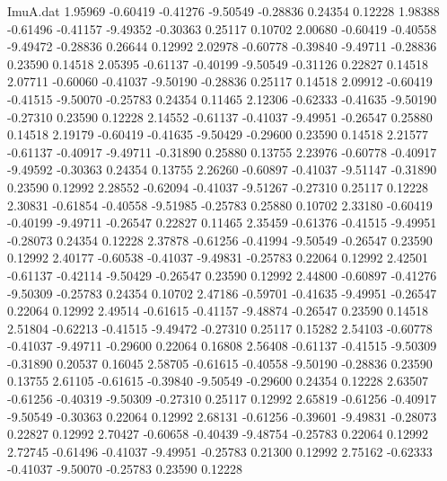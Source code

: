 \begin{filecontents}{ImuA.dat}
   1.95969   -0.60419   -0.41276   -9.50549   -0.28836    0.24354    0.12228
   1.98388   -0.61496   -0.41157   -9.49352   -0.30363    0.25117    0.10702
   2.00680   -0.60419   -0.40558   -9.49472   -0.28836    0.26644    0.12992
   2.02978   -0.60778   -0.39840   -9.49711   -0.28836    0.23590    0.14518
   2.05395   -0.61137   -0.40199   -9.50549   -0.31126    0.22827    0.14518
   2.07711   -0.60060   -0.41037   -9.50190   -0.28836    0.25117    0.14518
   2.09912   -0.60419   -0.41515   -9.50070   -0.25783    0.24354    0.11465
   2.12306   -0.62333   -0.41635   -9.50190   -0.27310    0.23590    0.12228
   2.14552   -0.61137   -0.41037   -9.49951   -0.26547    0.25880    0.14518
   2.19179   -0.60419   -0.41635   -9.50429   -0.29600    0.23590    0.14518
   2.21577   -0.61137   -0.40917   -9.49711   -0.31890    0.25880    0.13755
   2.23976   -0.60778   -0.40917   -9.49592   -0.30363    0.24354    0.13755
   2.26260   -0.60897   -0.41037   -9.51147   -0.31890    0.23590    0.12992
   2.28552   -0.62094   -0.41037   -9.51267   -0.27310    0.25117    0.12228
   2.30831   -0.61854   -0.40558   -9.51985   -0.25783    0.25880    0.10702
   2.33180   -0.60419   -0.40199   -9.49711   -0.26547    0.22827    0.11465
   2.35459   -0.61376   -0.41515   -9.49951   -0.28073    0.24354    0.12228
   2.37878   -0.61256   -0.41994   -9.50549   -0.26547    0.23590    0.12992
   2.40177   -0.60538   -0.41037   -9.49831   -0.25783    0.22064    0.12992
   2.42501   -0.61137   -0.42114   -9.50429   -0.26547    0.23590    0.12992
   2.44800   -0.60897   -0.41276   -9.50309   -0.25783    0.24354    0.10702
   2.47186   -0.59701   -0.41635   -9.49951   -0.26547    0.22064    0.12992
   2.49514   -0.61615   -0.41157   -9.48874   -0.26547    0.23590    0.14518
   2.51804   -0.62213   -0.41515   -9.49472   -0.27310    0.25117    0.15282
   2.54103   -0.60778   -0.41037   -9.49711   -0.29600    0.22064    0.16808
   2.56408   -0.61137   -0.41515   -9.50309   -0.31890    0.20537    0.16045
   2.58705   -0.61615   -0.40558   -9.50190   -0.28836    0.23590    0.13755
   2.61105   -0.61615   -0.39840   -9.50549   -0.29600    0.24354    0.12228
   2.63507   -0.61256   -0.40319   -9.50309   -0.27310    0.25117    0.12992
   2.65819   -0.61256   -0.40917   -9.50549   -0.30363    0.22064    0.12992
   2.68131   -0.61256   -0.39601   -9.49831   -0.28073    0.22827    0.12992
   2.70427   -0.60658   -0.40439   -9.48754   -0.25783    0.22064    0.12992
   2.72745   -0.61496   -0.41037   -9.49951   -0.25783    0.21300    0.12992
   2.75162   -0.62333   -0.41037   -9.50070   -0.25783    0.23590    0.12228

\end{filecontents}
